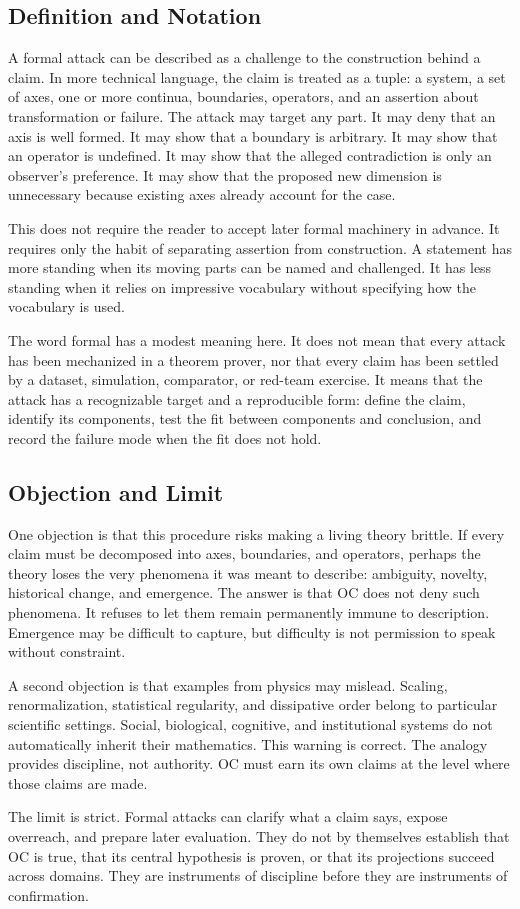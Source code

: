 \documentclass[11pt,a4paper,openany]{book}
\begin{document}
\subsection{Definition and Notation}
A formal attack can be described as a challenge to the construction behind a claim. In more technical language, the claim is treated as a tuple: a system, a set of axes, one or more continua, boundaries, operators, and an assertion about transformation or failure. The attack may target any part. It may deny that an axis is well formed. It may show that a boundary is arbitrary. It may show that an operator is undefined. It may show that the alleged contradiction is only an observer's preference. It may show that the proposed new dimension is unnecessary because existing axes already account for the case. \cite{kadanoff_scaling,wilson_renormalization}\par
This does not require the reader to accept later formal machinery in advance. It requires only the habit of separating assertion from construction. A statement has more standing when its moving parts can be named and challenged. It has less standing when it relies on impressive vocabulary without specifying how the vocabulary is used.\par
The word formal has a modest meaning here. It does not mean that every attack has been mechanized in a theorem prover, nor that every claim has been settled by a dataset, simulation, comparator, or red-team exercise. It means that the attack has a recognizable target and a reproducible form: define the claim, identify its components, test the fit between components and conclusion, and record the failure mode when the fit does not hold.\par
\subsection{Objection and Limit}
One objection is that this procedure risks making a living theory brittle. If every claim must be decomposed into axes, boundaries, and operators, perhaps the theory loses the very phenomena it was meant to describe: ambiguity, novelty, historical change, and emergence. The answer is that OC does not deny such phenomena. It refuses to let them remain permanently immune to description. Emergence may be difficult to capture, but difficulty is not permission to speak without constraint. \cite{kadanoff_scaling,wilson_renormalization}\par
A second objection is that examples from physics may mislead. Scaling, renormalization, statistical regularity, and dissipative order belong to particular scientific settings. Social, biological, cognitive, and institutional systems do not automatically inherit their mathematics. This warning is correct. The analogy provides discipline, not authority. OC must earn its own claims at the level where those claims are made.\par
The limit is strict. Formal attacks can clarify what a claim says, expose overreach, and prepare later evaluation. They do not by themselves establish that OC is true, that its central hypothesis is proven, or that its projections succeed across domains. They are instruments of discipline before they are instruments of confirmation.\par
\end{document}
